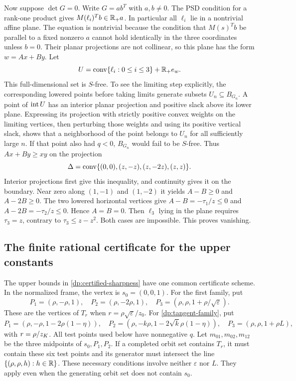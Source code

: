 Now suppose $\det G=0$. Write $G=a b^T$ with $a,b\ne0$.
The PSD condition for a rank-one product gives
$M(\ell_i)^Tb\in\mathbb R_+a$. In particular all $\ell_i$ lie in a
nontrivial affine plane. The equation is nontrivial because the condition
that $M(s)^Tb$ be parallel to a fixed nonzero $a$ cannot hold identically
in the three coordinates unless $b=0$.
Their planar projections are not collinear, so this plane has the form
$w=Ax+By$. Let
\[
 U=\operatorname{conv}\{\ell_i:0\le i\le3\}+\mathbb R_+e_w.
\]
This full-dimensional set is $S$-free. To see the limiting step explicitly,
the corresponding lowered points before taking limits generate subsets
$U_n\subseteq B_{G_n}$. A point of $\operatorname{int} U$ has an interior planar
projection and positive slack above its lower plane. Expressing its
projection with strictly positive convex weights on the limiting vertices,
then perturbing those weights and using its positive vertical slack, shows
that a neighborhood of the point belongs to $U_n$ for all sufficiently large
$n$. If that point also had $q<0$, $B_{G_n}$ would fail to be $S$-free.
Thus $Ax+By\ge xy$ on the projection
\[
 \Delta=\operatorname{conv}\{(0,0),(z,-z),(z,-2z),(z,z)\}.
\]
Interior projections first give this inequality, and continuity gives it
on the boundary. Near zero along $(1,-1)$ and $(1,-2)$ it yields
$A-B\ge0$ and $A-2B\ge0$. The two lowered horizontal vertices give
$A-B=-\tau_1/z\le0$ and $A-2B=-\tau_2/z\le0$. Hence $A=B=0$.
Then $\ell_3$ lying in the plane requires $\tau_3=z$, contrary to
$\tau_3\le z-z^2$. Both cases are impossible. This proves vanishing.

\subsection{The finite rational certificate for the upper constants}\label{dp:box-proof}

The upper bounds in \cref{dp:certified-sharpness} have one common
certificate scheme. In the normalized frame, the vertex is $s_0=(0,0,1)$.
For the first family, put
\[
 P_1=(\rho,-\rho,1),\quad P_2=(\rho,-2\rho,1),\quad
 P_3=(\rho,\rho,1+\rho/\sqrt\varepsilon).
\]
These are the vertices of $T_r$ when $r=\rho\sqrt\varepsilon/z_0$.
For \cref{dp:tangent-family}, put
\[
 P_1=(\rho,-\rho,1-2\rho(1-\eta)),\quad
 P_2=(\rho,-k\rho,1-2\sqrt k\rho(1-\eta)),\quad
 P_3=(\rho,\rho,1+\rho L),
\]
with $r=\rho/z_K$. All test points used below have nonnegative $q$.
Let $m_{01},m_{02},m_{12}$ be the three midpoints of $s_0,P_1,P_2$.
If a completed orbit set contains $T_r$, it must contain these six test
points and its generator must intersect the line
$\{(\rho,\rho,h):h\in\mathbb R\}$. These necessary conditions involve neither
$\varepsilon$ nor $L$. They apply even when the generating orbit set does
not contain $s_0$.

